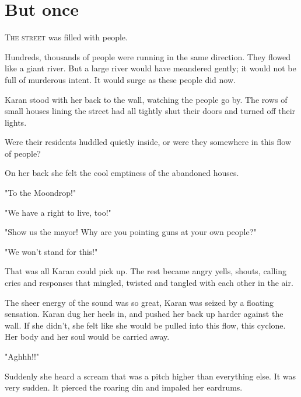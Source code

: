 
\chapter{But once}


\lettrine{T}{he street} was filled with people.

Hundreds, thousands of people were running in the same direction. They
flowed like a giant river. But a large river would have meandered
gently; it would not be full of murderous intent. It would surge as
these people did now.

Karan stood with her back to the wall, watching the people go by. The
rows of small houses lining the street had all tightly shut their doors
and turned off their lights.

Were their residents huddled quietly inside, or were they somewhere in
this flow of people?

On her back she felt the cool emptiness of the abandoned houses.

"To the Moondrop!"

"We have a right to live, too!"

"Show us the mayor! Why are you pointing guns at your own people?"

"We won't stand for this!"

That was all Karan could pick up. The rest became angry yells, shouts,
calling cries and responses that mingled, twisted and tangled with each
other in the air.

The sheer energy of the sound was so great, Karan was seized by a
floating sensation. Karan dug her heels in, and pushed her back up
harder against the wall. If she didn't, she felt like she would be
pulled into this flow, this cyclone. Her body and her soul would be
carried away.

"Aghhh!!"

Suddenly she heard a scream that was a pitch higher than everything
else. It was very sudden. It pierced the roaring din and impaled her
eardrums.

